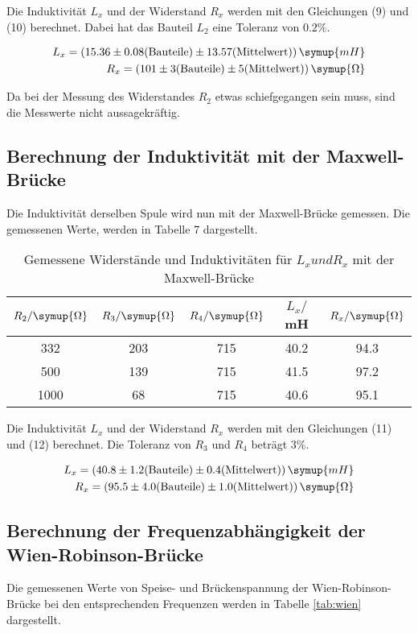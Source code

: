 Die Induktivität $L_{x}$ und der Widerstand $R_{x}$ werden mit den Gleichungen (9) und (10) berechnet. Dabei hat
das Bauteil $L_2$ eine Toleranz von $0.2\%$.

\begin{align*}
  L_{x} = (15.36 \pm 0.08\text{(Bauteile)} \pm 13.57\text{(Mittelwert)}) \, \symup{mH} \\
  R_x = (101 \pm 3\text{(Bauteile)} \pm 5\text{(Mittelwert)}) \, \symup{\Omega}
\end{align*}

Da bei der Messung des Widerstandes $R_2$ etwas schiefgegangen sein muss, sind die Messwerte nicht aussagekräftig.


\subsection{Berechnung der Induktivität mit der Maxwell-Brücke}
Die Induktivität derselben Spule wird nun mit der Maxwell-Brücke gemessen. Die gemessenen Werte, werden in Tabelle 7
dargestellt.

\begin{table}[H]
  \centering
  \caption{Gemessene Widerstände und Induktivitäten für $L_{x} und R_{x}$ mit der Maxwell-Brücke}
  \label{tab:Widerstand}
  \begin{tabular}{c c c c c}
    \toprule
     $R_2/ \symup{\Omega}$ & $R_3/ \symup{\Omega}$ & $R_4 / \symup{\Omega}$ & $L_x/$mH & $R_x/\symup{\Omega}$\\
    \midrule
    332 & 203 & 715 & 40.2 & 94.3 \\
    500 & 139 & 715 & 41.5 & 97.2 \\
   1000 &  68 & 715 & 40.6 & 95.1 \\
    \bottomrule
  \end{tabular}
\end{table}

Die Induktivität $L_{x}$ und der Widerstand $R_{x}$ werden mit den Gleichungen (11) und (12) berechnet. Die
Toleranz von $R_3$ und $R_4$ beträgt $3\%$.

\begin{align*}
  L_x = (40.8 \pm 1.2\text{(Bauteile)} \pm 0.4 \text{(Mittelwert)})  \, \symup{mH} \\
  R_x = (95.5 \pm 4.0\text{(Bauteile)} \pm 1.0\text{(Mittelwert)})   \, \symup{\Omega}
\end{align*}




\subsection{Berechnung der Frequenzabhängigkeit der Wien-Robinson-Brücke}
Die gemessenen Werte von Speise- und Brückenspannung der Wien-Robinson-Brücke bei
den entsprechenden Frequenzen werden in Tabelle \ref{tab:wien} dargestellt.

